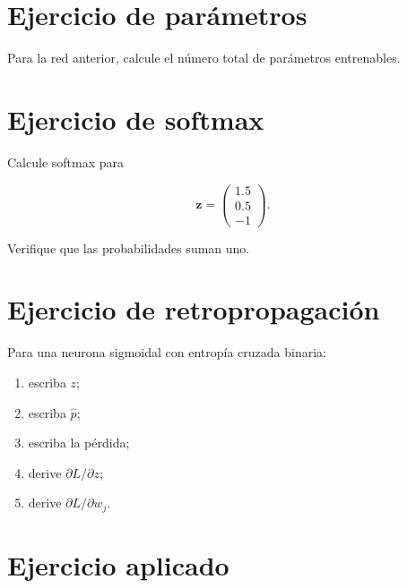 \documentclass[
  spanish,
  10.5pt,
  letterpaper,
  DIV=11,
  numbers=noendperiod,
  oneside,
  open=any]{scrreprt}
\providecommand{\tightlist}{%
  \setlength{\itemsep}{0pt}\setlength{\parskip}{0pt}}
\theoremstyle{definition}
\theoremstyle{definition}
\theoremstyle{plain}
\theoremstyle{remark}
\begin{document}
\section*{Ejercicio de parámetros}\label{ejercicio-de-paruxe1metros}


Para la red anterior, calcule el número total de parámetros entrenables.

\section*{Ejercicio de softmax}\label{ejercicio-de-softmax}


Calcule softmax para

\[
\mathbf{z}
=
\begin{pmatrix}
1.5\\
0.5\\
-1
\end{pmatrix}.
\]

Verifique que las probabilidades suman uno.

\section*{Ejercicio de
retropropagación}\label{ejercicio-de-retropropagaciuxf3n}


Para una neurona sigmoidal con entropía cruzada binaria:

\begin{enumerate}
\def\labelenumi{\arabic{enumi}.}
\tightlist
\item
  escriba \(z\);
\item
  escriba \(\widehat{p}\);
\item
  escriba la pérdida;
\item
  derive \(\partial L/\partial z\);
\item
  derive \(\partial L/\partial w_j\).
\end{enumerate}

\section*{Ejercicio aplicado}\label{ejercicio-aplicado-12}
\end{document}
